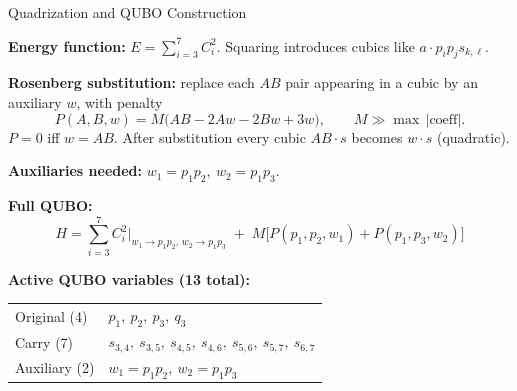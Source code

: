\documentclass[9pt]{beamer}
\begin{document}
\begin{frame}{Quadrization and QUBO Construction}
\small

\textbf{Energy function:} $E = \sum_{i=3}^{7} C_i^2$. Squaring introduces cubics like $a\cdot p_i p_j s_{k,\ell}$.

\medskip
\textbf{Rosenberg substitution:} replace each $AB$ pair appearing in a cubic by an auxiliary $w$, with penalty
\[
P(A,B,w) = M\bigl(AB - 2Aw - 2Bw + 3w\bigr),\qquad M \gg \max\,|\text{coeff}|.
\]
$P=0$ iff $w = AB$. After substitution every cubic $A B \cdot s$ becomes $w \cdot s$ (quadratic).

\medskip
\textbf{Auxiliaries needed:} $w_1 = p_1 p_2,\ w_2 = p_1 p_3$.

\medskip
\textbf{Full QUBO:}
\[
H = \sum_{i=3}^{7} C_i^2 \Big|_{w_1 \to p_1 p_2,\, w_2 \to p_1 p_3}
\;+\; M\bigl[P(p_1,p_2,w_1) + P(p_1,p_3,w_2)\bigr]
\]

\textbf{Active QUBO variables (13 total):}
\begin{center}
\begin{tabular}{ll}
\toprule
Original (4) & $p_1,\ p_2,\ p_3,\ q_3$ \\
Carry (7)    & $s_{3,4},\ s_{3,5},\ s_{4,5},\ s_{4,6},\ s_{5,6},\ s_{5,7},\ s_{6,7}$ \\
Auxiliary (2) & $w_1 = p_1 p_2,\ w_2 = p_1 p_3$ \\
\bottomrule
\end{tabular}
\end{center}
\end{frame}
\end{document}

